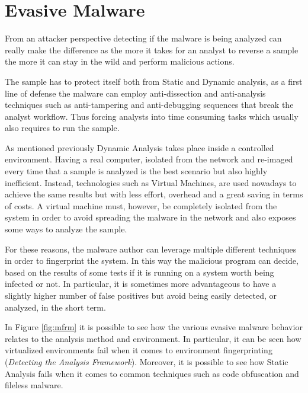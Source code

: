
 
\section{Evasive Malware}
\label{sec:evmal}

From an attacker perspective detecting if the malware is being analyzed can really make the difference as the more it takes for an analyst to reverse a sample the more it can stay in the wild and perform malicious actions. 

The sample has to protect itself both from Static and Dynamic analysis, as a first line of defense the malware can employ anti-dissection and anti-analysis techniques such as anti-tampering and anti-debugging sequences that break the analyst workflow. Thus forcing analysts into time consuming tasks which usually also requires to run the sample. 

As mentioned previously Dynamic Analysis takes place inside a controlled environment. Having a real computer, isolated from the network and re-imaged every time that a sample is analyzed is the best scenario but also highly inefficient. Instead, technologies such as Virtual Machines, are used nowadays to achieve the same results but with less effort, overhead and a great saving in terms of costs. A virtual machine must, however, be completely isolated from the system in order to avoid spreading the malware in the network and also exposes some ways to analyze the sample. 

For these reasons, the malware author can leverage multiple different techniques in order to fingerprint the system. In this way the malicious program can decide, based on the results of some tests if it is running on a system worth being infected or not. In particular, it is sometimes more advantageous to have a slightly higher number of false positives but avoid being easily detected, or analyzed, in the short term. 

In Figure \ref{fig:mfrm} it is possible to see how the various evasive malware behavior relates to the analysis method and environment. In particular, it can be seen how virtualized environments fail when it comes to environment fingerprinting (\textit{Detecting the Analysis Framework}). Moreover, it is possible to see how Static Analysis fails when it comes to common techniques such as code obfuscation and fileless malware.

